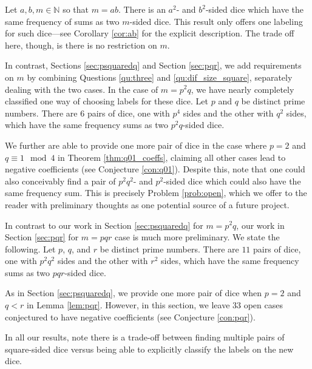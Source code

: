 \documentclass[11pt]{amsart}
\numberwithin{equation}{section}
\theoremstyle{plain}
\newenvironment{customthm}[1]
  {\renewcommand\theinnercustomthm{#1}\innercustomthm}
  {\endinnercustomthm}
\theoremstyle{definition}
\def\N{\mathbb N}
\begin{document}
\begin{customthm}{\ref{theorem:cs2n}}
Let $a,b,m\in \N$ so that $m=ab$. There is an $a^2$- and $b^2$-sided dice which have the same frequency of sums as two $m$-sided dice. 
\end{customthm}
\noindent This result only offers one labeling for such dice---see Corollary \ref{cor:ab} for the explicit description. The trade off here, though, is there is no restriction on $m$.

In contrast, Sections \ref{sec:psquaredq} and Section \ref{sec:pqr}, we add requirements on $m$ by combining Questions \ref{qu:three} and \ref{qu:dif_size_square}, separately dealing with the two cases. In the case of $m=p^2q$, we have nearly completely classified one way of choosing labels for these dice.
\begin{customthm}{\ref{thm:positive}}
Let $p$ and $q$ be distinct prime numbers. There are $6$ pairs of dice, one with $p^4$ sides and the other with $q^2$ sides, which have the same frequency sums as two $p^2q$-sided dice. 
\end{customthm}

\noindent We further are able to provide one more pair of dice in the case where $p=2$ and $q\equiv 1\mod 4$ in Theorem \ref{thm:q01_coeffs}, claiming all other cases lead to negative coefficients (see Conjecture \ref{con:q01}). Despite this, note that one could also conceivably find a pair of $p^2q^2$- and $p^2$-sided dice which could also have the same frequency sum. This is precisely Problem \ref{prob:open}, which we offer to the reader with preliminary thoughts as one potential source of a future project. 

In contrast to our work in Section \ref{sec:psquaredq} for $m=p^2q$, our work in Section \ref{sec:pqr} for $m=pqr$ case is much more preliminary. We state the following.
\begin{customthm}{\ref{thm:pqr}}
Let $p$, $q$, and $r$ be distinct prime numbers. There are $11$ pairs of dice, one with $p^2q^2$ sides and the other with $r^2$ sides, which have the same frequency sums as two $pqr$-sided dice.
\end{customthm}

\noindent As in Section \ref{sec:psquaredq}, we provide one more pair of dice when $p=2$ and $q<r$ in Lemma \ref{lem:pqr}. However, in this section, we leave $33$ open cases conjectured to have negative coefficients (see Conjecture \ref{con:pqr}).

In all our results, note there is a trade-off between finding multiple pairs of square-sided dice versus being able to explicitly classify the labels on the new dice.
\end{document}

